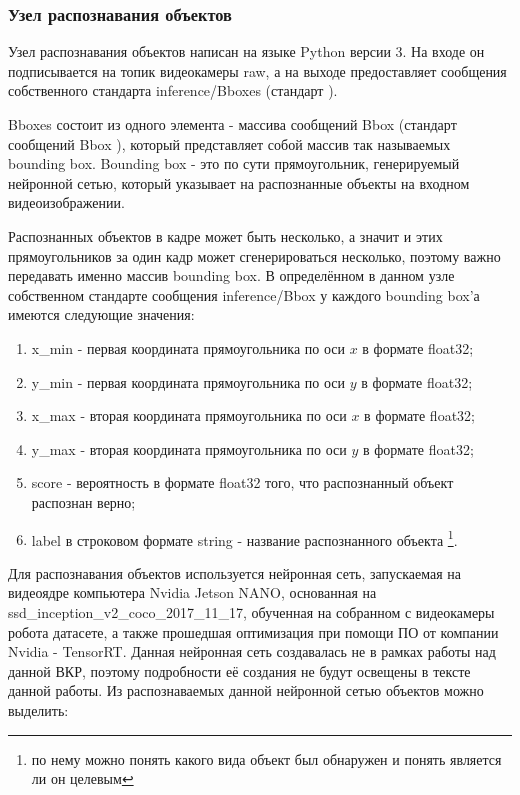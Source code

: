 \subsubsection{Узел распознавания объектов}
Узел распознавания объектов написан на языке Python версии 3. На входе он подписывается на топик видеокамеры raw, а на выходе предоставляет сообщения собственного стандарта inference/Bboxes (стандарт ). 

Bboxes состоит из одного элемента - массива сообщений Bbox (стандарт сообщений Bbox ), который представляет собой массив так называемых bounding box. Bounding box - это по сути прямоугольник, генерируемый нейронной сетью, который указывает на распознанные объекты на входном видеоизображении. 

Распознанных объектов в кадре может быть несколько, а значит и этих прямоугольников за один кадр может сгенерироваться несколько, поэтому важно передавать именно массив bounding box. В определённом в данном узле собственном стандарте сообщения inference/Bbox у каждого bounding box'а имеются следующие значения:

\begin{enumerate}
\item x\_min - первая координата прямоугольника по оси $x$ в формате float32;
\item y\_min - первая координата прямоугольника по оси $y$ в формате float32;
\item x\_max - вторая координата прямоугольника по оси $x$ в формате float32;
\item y\_max - вторая координата прямоугольника по оси $y$ в формате float32;
\item score - вероятность в формате float32 того, что распознанный объект распознан верно;
\item label в строковом формате string - название распознанного объекта \footnote{по нему можно понять какого вида объект был обнаружен и понять является ли он целевым}.
\end{enumerate}

Для распознавания объектов используется нейронная сеть, запускаемая на видеоядре компьютера Nvidia Jetson NANO, основанная на ssd\_inception\_v2\_coco\_2017\_11\_17, обученная на собранном с видеокамеры робота датасете, а также прошедшая оптимизация при помощи ПО от компании Nvidia - TensorRT. Данная нейронная сеть создавалась не в рамках работы над данной ВКР, поэтому подробности её создания не будут освещены в тексте данной работы. Из распознаваемых данной нейронной сетью объектов можно выделить:

